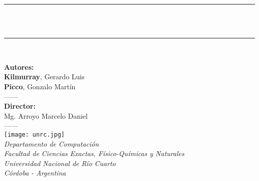 \newcommand{\HRule}{\rule{\linewidth}{0.6mm}}
\begin{titlepage}

\begin{center}


\vspace*{1.5cm}

  {\Large{\textbf{}}}
\vspace*{0.4cm}
\HRule \\
  \vspace*{0.2cm}
  {\Huge\textbf{\maggen\\}}
  \vspace*{0.2cm}
 
\HRule \\[0.5cm]

\vspace*{1.2cm}

\large{\textbf{Autores:}\\ \textbf{Kilmurray}, Gerardo Luis\\ \textbf{Picco}, Gonzalo Martín\\}
\vspace*{0.6cm}
{------\\}
\vspace*{0.6cm}
\large{\textbf{Director:}\\ Mg. Arroyo Marcelo Daniel\\}
\vspace*{1cm}
{------\\}
\vspace*{1cm}
 \texttt{[image: unrc.jpg]}\\
\vspace*{0.5cm}
\normalsize{\textit{Departamento de Computación\\
                    Facultad de Ciencias Exactas, Físico-Químicas y Naturales\\
                    Universidad Nacional de Río Cuarto\\
                    Córdoba - Argentina}}
\end{center}
\end{titlepage}
\sloppy

\titlepage

